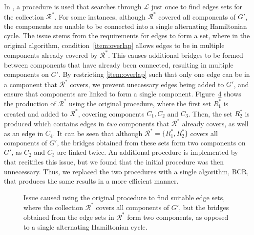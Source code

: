 \documentclass[authoryear]{elsarticle}
\begin{document}
\noindent In \citet{becker2010}, a procedure is used that searches through $\mathcal{L}$ just once to find edges sets for the collection $\mathcal{R}^*$. For some instances, although $\mathcal{R}^*$ covered all components of $G'$, the components are unable to be connected into a single alternating Hamiltonian cycle. The issue stems from the requirements for edges to form a set, where in the original algorithm, condition~\ref{item:overlap} allows edges to be in multiple components already covered by $\mathcal{R}^*$. This causes additional bridges to be formed between components that have already been connected, resulting in multiple components on $G'$. By restricting \ref{item:overlap} such that only one edge can be in a component that $\mathcal{R}^*$ covers, we prevent unecessary edges being added to $G'$, and ensure that components are linked to form a single component. Figure~\ref{fig:overlaperror} shows the production of $\mathcal{R}^*$ using the original procedure, where the first set $R^*_1$ is created and added to $\mathcal{R}^*$, covering components $C_1, C_2$ and $C_3$. Then, the set $R^*_2$ is produced which contains edges in \emph{two} components that $\mathcal{R}^*$ already covers, as well as an edge in $C_4$. It can be seen that although $\mathcal{R}^* = \{R^*_1, R^*_2\}$ covers all components of $G'$, the bridges obtained from these sets form two components on $G'$, as $C_2$ and $C_3$ are linked twice. An additional procedure is implemented by \citet{hawa2018} that recitifies this issue, but we found that the initial procedure was then unnecessary. Thus, we replaced the two procedures with a single algorithm, BCR, that produces the same results in a more efficient manner. 

\begin{figure}[H]
	\centering	
	\begin{subfigure}[h]{0.35\textwidth}
		
		\caption{}
		\label{fig:bcrerror}
	\end{subfigure} \hspace{5mm}
	\begin{subfigure}[h]{0.25\textwidth}
		
		\caption{}
		\label{fig:overlaperror1}
	\end{subfigure} \hspace{5mm}
	\begin{subfigure}[h]{0.25\textwidth}
		
		\caption{}
		\label{fig:overlaperror2}
	\end{subfigure}
	\caption{Issue caused using the original procedure to find suitable edge sets, where the collection $\mathcal{R}^*$ covers all components of $G'$, but the bridges obtained from the edge sets in $\mathcal{R}^*$ form two components, as opposed to a single alternating Hamiltonian cycle.}	
	\label{fig:overlaperror}
\end{figure}
\end{document}
